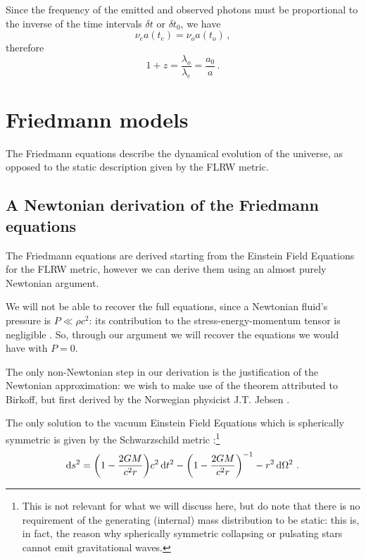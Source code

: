 \documentclass[main.tex]{subfiles}
\begin{document}
Since the frequency of the emitted and observed photons must be proportional to the inverse of the time intervals \(\delta t\) or \(\delta t_0 \), we have
\begin{equation}
  \nu_{e} a(t_{e}) = \nu_{o} a(t_{o})\,,
\end{equation}
%
therefore 
%
\begin{equation}
  1 + z = \frac{\lambda_{o}}{\lambda_{e}}
  = \frac{a_0 }{a}\,.
\end{equation}

\chapter{Friedmann models}

The Friedmann equations describe the dynamical evolution of the universe, as opposed to the static description given by the FLRW metric.

\section{A Newtonian derivation of the Friedmann equations}

The Friedmann equations are derived starting from the Einstein Field Equations for the FLRW metric, however we can derive them using an almost purely Newtonian argument.

We will not be able to recover the full equations, since a Newtonian fluid's pressure is \(P \ll \rho c^2\): its contribution to the stress-energy-momentum tensor is negligible \cite[eqs. 441--443]{tissinoGeneralRelativityNotes2020}.
So, through our argument we will recover the equations we would have with \(P=0\).

The only non-Newtonian step in our derivation is the justification of the Newtonian approximation: we wish to make use of the theorem attributed to Birkoff, but first derived by the Norwegian physicist J.T. Jebsen \cite[]{johansenDiscoveryBirkhoffTheorem2005}.

\begin{proposition}
The only solution to the vacuum Einstein Field Equations which is spherically symmetric is given by the Schwarzschild metric \cite[sec. 32.2]{misnerGravitation1973}:\footnote{This is not relevant for what we will discuss here, but do note that there is no requirement of the generating (internal) mass distribution to be static: this is, in fact, the reason why spherically symmetric collapsing or pulsating stars cannot emit  gravitational waves.}
%
\begin{align}
\dd{s^2} =  \qty(1 - \frac{2GM}{c^2r}) c^2 \dd{t^2} 
- \qty(1 - \frac{2GM}{c^2r})^{-1} - r^2 \dd{\Omega^2}
\,.
\end{align}
\end{proposition}
\end{document}
